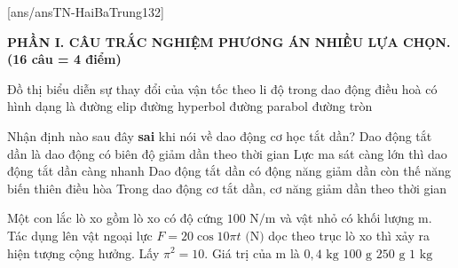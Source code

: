 [ans/ansTN-HaiBaTrung132]

\noindent \textbf{PHẦN I. CÂU TRẮC NGHIỆM PHƯƠNG ÁN NHIỀU LỰA CHỌN. (16 câu = 4 điểm)}

\begin{ex}	Đồ thị biểu diễn sự thay đổi của vận tốc theo li độ trong dao động điều hoà có hình dạng là
	\choice
	{\True đường elip}
	{đường hyperbol}
	{đường parabol}
	{đường tròn}
\end{ex}

\begin{ex}	Nhận định nào sau đây \textbf{sai} khi nói về dao động cơ học tắt dần?
	\choice
	{Dao động tắt dần là dao động có biên độ giảm dần theo thời gian}
	{Lực ma sát càng lớn thì dao động tắt dần càng nhanh}
	{\True Dao động tắt dần có động năng giảm dần còn thế năng biến thiên điều hòa}
	{Trong dao động cơ tắt dần, cơ năng giảm dần theo thời gian}
\end{ex}

\begin{ex}	Một con lắc lò xo gồm lò xo có độ cứng $100\text{ N/m}$ và vật nhỏ có khối lượng m. Tác dụng lên vật ngoại lực $F=20 \cos 10 \pi t\text{ (N)}$ dọc theo trục lò xo thì xảy ra hiện tượng cộng hưởng. Lấy $\pi^{2}=10$. Giá trị của m là
	\choice
	{$0,4\text{ kg}$}
	{$100\text{ g}$}
	{$250\text{ g}$}
	{\True $1\text{ kg}$}
\end{ex}

